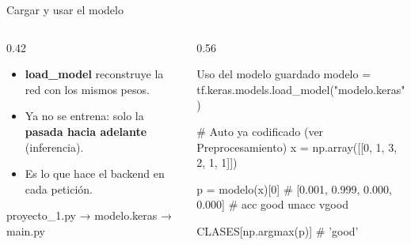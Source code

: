 \documentclass[10pt,aspectratio=169]{beamer}
\begin{document}
\begin{frame}[fragile]{Cargar y usar el modelo}
  \begin{columns}[c]
    \begin{column}{0.42\textwidth}
      \small
      \begin{itemize}
        \setlength{\itemsep}{0.5em}
        \item \textbf{load\_model} reconstruye la red con los mismos pesos.
        \item Ya no se entrena: solo la \textbf{pasada hacia adelante}
              (inferencia).
        \item Es lo que hace el backend en cada petición.
      \end{itemize}
      \vspace{1em}
      {\scriptsize\ttfamily proyecto\_1.py → modelo.keras → main.py\par}
    \end{column}
    \begin{column}{0.56\textwidth}
\begin{codigo}{Uso del modelo guardado}
modelo = tf.keras.models.load_model("modelo.keras")

# Auto ya codificado (ver Preprocesamiento)
x = np.array([[0, 1, 3, 2, 1, 1]])

p = modelo(x)[0]
# [0.001, 0.999, 0.000, 0.000]
#   acc   good   unacc  vgood

CLASES[np.argmax(p)]
# 'good'
\end{codigo}
    \end{column}
  \end{columns}
\end{frame}
\end{document}
